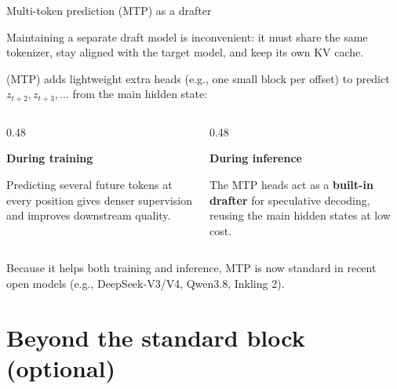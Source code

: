 \documentclass[11pt,aspectratio=169]{beamer}
\begin{document}
\begin{frame}{Multi-token prediction (MTP) as a drafter}
    \setlength{\parskip}{5pt}

    Maintaining a separate draft model is inconvenient: it must share the same
    tokenizer, stay aligned with the target model, and keep its own KV cache.

     (MTP) adds lightweight extra heads (e.g.,
    one small block per offset) to predict $z_{t+2}, z_{t+3}, \ldots$ from the
    main hidden state:

    \begin{columns}[T,onlytextwidth]
        \begin{column}{0.48\textwidth}
            \begin{tcolorbox}[nndsblue,courseheight={mtp-role}{0.25\textheight},boxsep=1mm,top=1.5mm,bottom=1.5mm]\small
                \textbf{\color{darkcerulean}During training}\par
                Predicting several future tokens at every position gives
                denser supervision and improves downstream quality.
            \end{tcolorbox}
        \end{column}
        \begin{column}{0.48\textwidth}
            \begin{tcolorbox}[nndsgreen,courseheight={mtp-role}{0.25\textheight},boxsep=1mm,top=1.5mm,bottom=1.5mm]\small
                \textbf{\color{darkgreen}During inference}\par
                The MTP heads act as a \textbf{built-in drafter} for
                speculative decoding, reusing the main hidden states at low
                cost.
            \end{tcolorbox}
        \end{column}
    \end{columns}

    \smallskip
    Because it helps both training and inference, MTP is now standard in
    recent open models (e.g., DeepSeek-V3/V4, Qwen3.8, Inkling 2).


\end{frame}

\section{Beyond the standard block (optional)}
\end{document}
